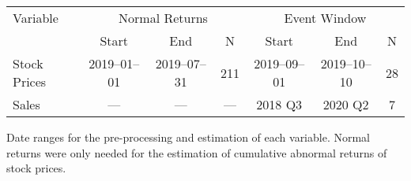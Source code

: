 \documentclass[12pt]{article}
\begin{document}

\begin{table}
    \label{tab:data_freq}
    \centering

    \begin{tabular}{l|ccc|ccc}
        \toprule
        Variable     & \multicolumn{3}{c|}{Normal Returns} & \multicolumn{3}{c}{Event Window} \\
                     & Start & End          & N                 &   Start & End     &     N \\ 
        \midrule
        Stock Prices & 2019--01--01 & 2019--07--31 & 211 & 2019--09--01 & 2019--10--10 & 28\\
        Sales        & ---           &     ---     & --- & 2018 Q3 & 2020 Q2 & 7\\  
        \bottomrule
    \end{tabular}

    \vspace{0.2cm}

    \begin{tablenotes}
        \footnotesize
        \item Date ranges for the pre-processing and estimation of each variable. Normal returns were only needed for the estimation of cumulative abnormal returns of stock prices.
    \end{tablenotes}
\end{table}


\end{document}
